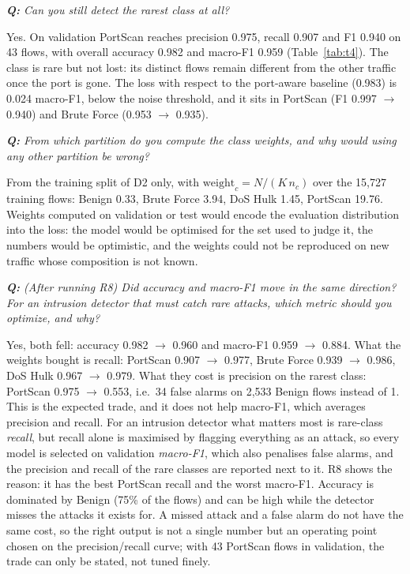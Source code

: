 \documentclass[9pt]{extarticle}
\newcommand{\qa}[1]{\par\vspace{2pt}\noindent\textit{\textbf{Q:} #1}\par\nopagebreak\noindent}
\newcommand{\run}[1]{\textsf{#1}}   %
\begin{document}
\qa{Can you still detect the rarest class at all?}
Yes. On validation PortScan reaches precision 0.975, recall 0.907 and F1 0.940 on 43 flows, with
overall accuracy 0.982 and macro-F1 0.959 (Table~\ref{tab:t4}). The class is rare but not lost: its
distinct flows remain different from the other traffic once the port is gone. The loss with respect
to the port-aware baseline (0.983) is 0.024 macro-F1, below the noise threshold, and it sits in
PortScan (F1 0.997 $\to$ 0.940) and Brute Force (0.953 $\to$ 0.935).

\qa{From which partition do you compute the class weights, and why would using any other partition
be wrong?}
From the training split of \run{D2} only, with $\mathrm{weight}_c = N/(K\,n_c)$ over the 15,727
training flows: Benign 0.33, Brute Force 3.94, DoS Hulk 1.45, PortScan 19.76. Weights computed on
validation or test would encode the evaluation distribution into the loss: the model would be
optimised for the set used to judge it, the numbers would be optimistic, and the weights could not
be reproduced on new traffic whose composition is not known.

\qa{(After running \run{R8}) Did accuracy and macro-F1 move in the same direction? For an intrusion
detector that must catch rare attacks, which metric should you optimize, and why?}
Yes, both fell: accuracy 0.982 $\to$ 0.960 and macro-F1 0.959 $\to$ 0.884.
What the weights bought is recall: PortScan 0.907 $\to$ 0.977, Brute Force 0.939 $\to$ 0.986, DoS
Hulk 0.967 $\to$ 0.979. What they cost is precision on the rarest class: PortScan 0.975 $\to$ 0.553,
i.e.\ 34 false alarms on 2,533 Benign flows instead of 1. This is the expected trade, and it does not
help macro-F1, which averages precision and recall. For an intrusion detector what matters most is
rare-class \emph{recall}, but recall alone is maximised by flagging everything as an attack, so
every model is selected on validation \emph{macro-F1}, which also penalises false alarms, and the
precision and recall of the rare classes are reported next to it. \run{R8} shows the reason: it has the best
PortScan recall and the worst macro-F1. Accuracy is dominated by Benign (75\% of
the flows) and can be high while the detector misses the attacks it exists for. A missed attack and
a false alarm do not have the same cost, so the right output is not a single number but an operating
point chosen on the precision/recall curve; with 43 PortScan flows in validation, the trade can
only be stated, not tuned finely.
\end{document}
